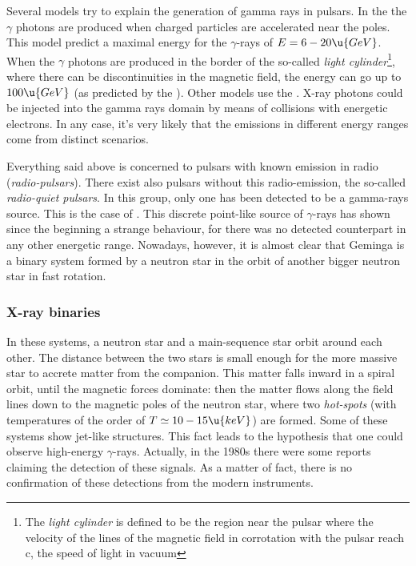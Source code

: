 Several models try to explain the generation of gamma rays in pulsars.
In the \emph{} the $\gamma$ photons are produced
when charged particles are accelerated near the poles. This model
predict a maximal energy for the $\gamma$-rays of $E=6-20\u{GeV}$.
When the $\gamma$ photons are produced in the border of the so-called
\emph{light cylinder}\footnote{The \emph{light cylinder} is defined to
  be the region near the pulsar where the velocity of the lines of the
  magnetic field in corrotation with the pulsar reach c, the speed of
  light in vacuum}, where there can be discontinuities in the magnetic
field, the energy can go up to $100\u{GeV}$ (as predicted by the
\emph{}). Other models use the \emph{}. X-ray photons could be injected into the gamma
rays domain by means of collisions with energetic electrons. In any
case, it's very likely that the emissions in different energy ranges
come from distinct scenarios.

Everything said above is concerned to pulsars with known emission in
radio (\emph{radio-pulsars}). There exist also pulsars without this
radio-emission, the so-called \emph{radio-quiet pulsars}. In this
group, only one has been detected to be a gamma-rays source. This is
the case of . This discrete point-like source of $\gamma$-rays
has shown since the beginning a strange behaviour, for there was no
detected counterpart in any other energetic range.  Nowadays, however,
it is almost clear that Geminga is a binary system formed by a neutron
star in the orbit of another bigger neutron star in fast rotation.


\subsubsection{X-ray binaries}
\label{sec:xbinaries}

In these systems, a neutron star and a main-sequence star orbit around
each other.  The distance between the two stars is small enough for
the more massive star to accrete matter from the companion. This
matter falls inward in a spiral orbit, until the magnetic forces
dominate: then the matter flows along the field lines down to the
magnetic poles of the neutron star, where two \emph{hot-spots} (with
temperatures of the order of $T\simeq 10-15\u{keV}$) are formed. Some of
these systems show jet-like structures. This fact leads to the
hypothesis that one could observe high-energy $\gamma$-rays. Actually, in
the 1980s there were some reports claiming the detection of these
signals. As a matter of fact, there is no confirmation of these
detections from the modern instruments.


